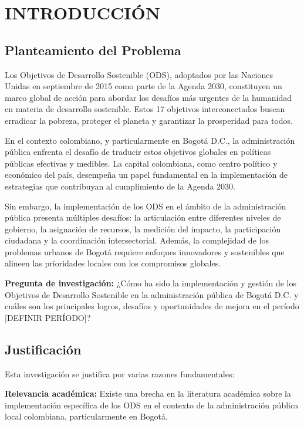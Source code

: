 \section{INTRODUCCIÓN}

\subsection{Planteamiento del Problema}

Los Objetivos de Desarrollo Sostenible (ODS), adoptados por las Naciones Unidas en septiembre de 2015 como parte de la Agenda 2030, constituyen un marco global de acción para abordar los desafíos más urgentes de la humanidad en materia de desarrollo sostenible. Estos 17 objetivos interconectados buscan erradicar la pobreza, proteger el planeta y garantizar la prosperidad para todos.

En el contexto colombiano, y particularmente en Bogotá D.C., la administración pública enfrenta el desafío de traducir estos objetivos globales en políticas públicas efectivas y medibles. La capital colombiana, como centro político y económico del país, desempeña un papel fundamental en la implementación de estrategias que contribuyan al cumplimiento de la Agenda 2030.

Sin embargo, la implementación de los ODS en el ámbito de la administración pública presenta múltiples desafíos: la articulación entre diferentes niveles de gobierno, la asignación de recursos, la medición del impacto, la participación ciudadana y la coordinación intersectorial. Además, la complejidad de los problemas urbanos de Bogotá requiere enfoques innovadores y sostenibles que alineen las prioridades locales con los compromisos globales.

\textbf{Pregunta de investigación:} ¿Cómo ha sido la implementación y gestión de los Objetivos de Desarrollo Sostenible en la administración pública de Bogotá D.C. y cuáles son los principales logros, desafíos y oportunidades de mejora en el período [DEFINIR PERÍODO]?

\subsection{Justificación}

Esta investigación se justifica por varias razones fundamentales:

\textbf{Relevancia académica:} Existe una brecha en la literatura académica sobre la implementación específica de los ODS en el contexto de la administración pública local colombiana, particularmente en Bogotá.

